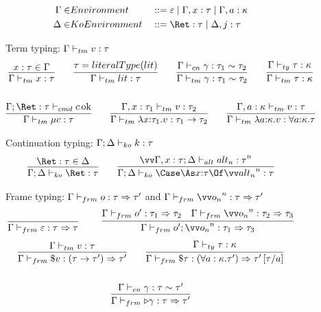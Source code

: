 \documentclass{article}
\begin{document}
\begin{figure}
\centering
\begin{align*}
  \Gamma \in& Environment
  &
  &::= \mt
  \Alt \Gamma, x : \ty
  \Alt \Gamma, a : \ki
  \\
  \Delta \in& KoEnvironment
  &
  &::= \ret q : \ty
  \Alt \Delta, j : \ty
\end{align*}

Term typing: $\Gamma \vdash_{tm} v : \tau$
\begin{gather*}
  \infer
  {\typetm{\Gamma}{x}{\ty}}
  {x:\ty \in \Gamma}
  \qquad
  \infer
  {\typetm{\Gamma}{\lit}{\ty}}
  {\ty = literalType(\lit)}
  \qquad
  \infer
  {\typetm{\Gamma}{\cn}{\eqty{\ty_1}{\ty_2}}}
  {\typecn{\Gamma}{\cn}{\eqty{\ty_1}{\ty_2}}}
  \qquad
  \infer
  {\typetm{\Gamma}{\ty}{\ki}}
  {\typety{\Gamma}{\ty}{\ki}}
  \\\\
  \infer
  {\typetm{\Gamma}{\compute{\ann q \ty} \cmd}{\ty}}
  {\typecmd{\Gamma}{\ret q:\ty}{\cmd}}
  \qquad
  \infer
  {\typetm{\Gamma}{\fn{\ann x {\ty_1}} \tm}{\ty_1 \to \ty_2}}
  {\typetm{\Gamma, x:\ty_1}{\tm}{\ty_2}}
  \qquad
  \infer
  {\typetm{\Gamma}{\fn{\ann a \ki} \tm}{\forall \ann a \ki. \ty}}
  {\typetm{\Gamma, a:\ki}{\tm}{\ty}}
\end{gather*}

Continuation typing: $\Gamma; \Delta \vdash_{ko} k : \tau$
\begin{gather*}
  \infer
  {\typeko{\Gamma}{\Delta}{\ret q}{\ty}}
  {\ret q:\ty \in \Delta}
  \qquad
  \infer
  {\typeko{\Gamma}{\Delta}{\caseas{\ann x \ty}{\vect[n]{\analt_n}}}{\ty}}
  {
    \vect[n]{
      \typealt{\Gamma, x:\ty}{\Delta}{\analt_n}{\ty}
    }
  }
\end{gather*}

Frame typing: $\Gamma \vdash_{frm} o : \tau \Rightarrow \tau'$ and
$\typefrm{\Gamma}{\vect[n]{\frm_n}}{\ty}{\ty'}$
\begin{gather*}
  \axiom{\typefrm{\Gamma}{\mt}{\ty}{\ty}}
  \qquad
  \infer
  {\typefrm{\Gamma}{\frm' \then \vect[n]{\frm_n}}{\ty_1}{\ty_3}}
  {
    \typefrm{\Gamma}{\frm'}{\ty_1}{\ty_2}
    &
    \typefrm{\Gamma}{\vect[n]{\frm_n}}{\ty_2}{\ty_3}
  }
\end{gather*}
\begin{gather*}
  \infer
  {\typefrm{\Gamma}{\appto{\tm}}{(\ty \to \ty')}{\ty'}}
  {\typetm{\Gamma}{\tm}{\ty}}
  \qquad
  \infer
  {\typefrm{\Gamma}{\inst{\ty}}{(\forall a:\ki.\ty')}{\ty'\subst{a}{\ty}}}
  {\typety{\Gamma}{\ty}{\ki}}
  \\\\
  \infer
  {\typefrm{\Gamma}{\castby{\cn}}{\ty}{\ty'}}
  {\typecn{\Gamma}{\cn}{\eqty{\ty}{\ty'}}}
\end{gather*}


\end{figure}
\end{document}
